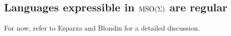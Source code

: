 \documentclass[11pt,twoside=off,numbers=noenddot]{scrbook}
\begin{document}
\subsection{Languages expressible in $\text{MSO}(\Sigma)$ are regular}
For now, refer to Esparza and Blondin \cite{esparza2023automata} for a detailed discussion.

\printbibliography[nottype=image]
\end{document}

